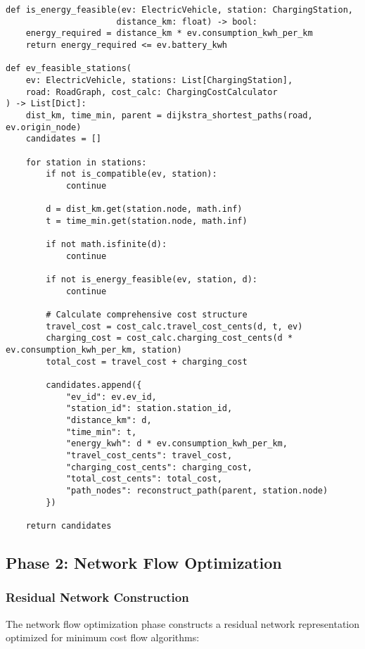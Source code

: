 \documentclass[12pt,a4paper]{article}
\begin{document}
\begin{lstlisting}[caption=Energy Feasibility Validation]
def is_energy_feasible(ev: ElectricVehicle, station: ChargingStation, 
                      distance_km: float) -> bool:
    energy_required = distance_km * ev.consumption_kwh_per_km
    return energy_required <= ev.battery_kwh

def ev_feasible_stations(
    ev: ElectricVehicle, stations: List[ChargingStation], 
    road: RoadGraph, cost_calc: ChargingCostCalculator
) -> List[Dict]:
    dist_km, time_min, parent = dijkstra_shortest_paths(road, ev.origin_node)
    candidates = []
    
    for station in stations:
        if not is_compatible(ev, station):
            continue
            
        d = dist_km.get(station.node, math.inf)
        t = time_min.get(station.node, math.inf)
        
        if not math.isfinite(d):
            continue
            
        if not is_energy_feasible(ev, station, d):
            continue
            
        # Calculate comprehensive cost structure
        travel_cost = cost_calc.travel_cost_cents(d, t, ev)
        charging_cost = cost_calc.charging_cost_cents(d * ev.consumption_kwh_per_km, station)
        total_cost = travel_cost + charging_cost
        
        candidates.append({
            "ev_id": ev.ev_id,
            "station_id": station.station_id,
            "distance_km": d,
            "time_min": t,
            "energy_kwh": d * ev.consumption_kwh_per_km,
            "travel_cost_cents": travel_cost,
            "charging_cost_cents": charging_cost,
            "total_cost_cents": total_cost,
            "path_nodes": reconstruct_path(parent, station.node)
        })
    
    return candidates
\end{lstlisting}

\subsection{Phase 2: Network Flow Optimization}

\subsubsection{Residual Network Construction}

The network flow optimization phase constructs a residual network representation optimized for minimum cost flow algorithms:
\end{document}
